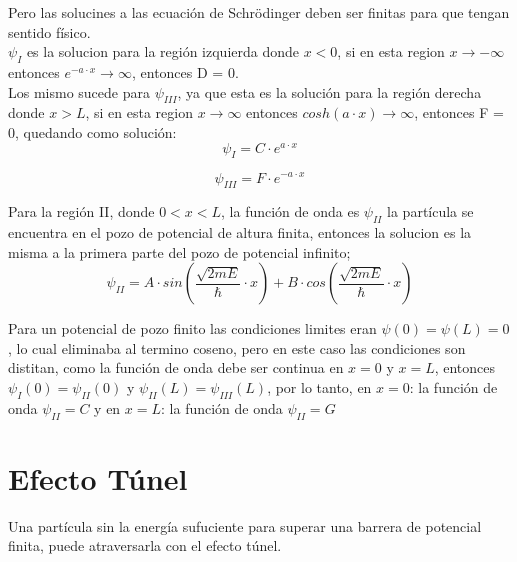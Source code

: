 \documentclass[a4paper]{article}
\begin{document}
            \indent Pero las solucines a las ecuación de Schrödinger deben ser finitas para que tengan sentido físico.\\
            \indent $\psi_I$  es la solucion para la región izquierda donde $x < 0$, si en esta region $x \rightarrow -\infty$ entonces $e^{-a \cdot x} \rightarrow \infty$, entonces D = 0.\\
            \indent Los mismo sucede para $\psi_{III}$, ya que esta es la solución para la región derecha donde $x > L$, si en esta region $x \rightarrow \infty$ entonces $cosh(a \cdot x) \rightarrow \infty$, entonces F = 0, quedando como solución:\\

            \begin{equation}
                \psi_I = C \cdot e^{a \cdot x}
            \end{equation}

            \begin{equation}
                \psi_{III} = F \cdot e^{-a \cdot x} 
            \end{equation}

            \indent Para la región II, donde $0 < x < L$, la función de onda es $\psi_{II}$
            la partícula se encuentra en el pozo de potencial de altura finita, entonces la solucion es la misma a la primera parte del pozo de potencial infinito;\\

            \begin{equation}
                \psi_{II} = A \cdot sin(\frac{\sqrt{2mE}}{\hbar} \cdot x) + B \cdot cos(\frac{\sqrt{2mE}}{\hbar} \cdot x)
            \end{equation}

            \indent Para un potencial de pozo finito las condiciones limites eran $\psi(0) = \psi(L) = 0$, lo cual eliminaba al termino coseno, pero en este caso las condiciones son distitan, como la función de onda debe ser continua en $x = 0$ y $x = L$, entonces $\psi_I(0) = \psi_{II}(0)$ y $\psi_{II}(L) = \psi_{III}(L)$, por lo tanto, en $x = 0$: la función de onda $\psi_{II} = C$ y en $x = L$: la función de onda $\psi_{II} = G$

    \section{Efecto Túnel}

            \indent Una partícula sin la energía sufuciente para superar una barrera de potencial finita, puede atraversarla con el efecto túnel.\\
\end{document}
